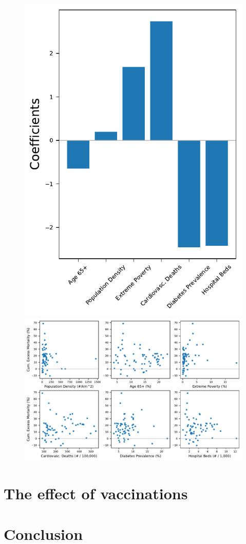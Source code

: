 \documentclass{article}
\begin{document}
\lipsum[1]

\begin{figure}[t]
	\begin{minipage}{0.3\linewidth}
		\includegraphics[width=\linewidth]{fig/fig_linear_regression_em}
	\end{minipage}\hfill
	\begin{minipage}{0.65\linewidth}
		\includegraphics[width=\linewidth]{fig/fig_em_correlation}
	\end{minipage}
\end{figure}

\lipsum[1]

\section{The effect of vaccinations}

\lipsum[1]

\section{Conclusion}

\lipsum[1]
\end{document}
